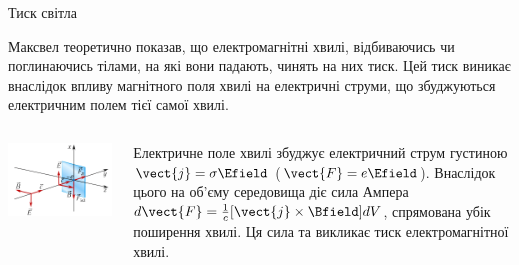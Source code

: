 \documentclass[onlytextwidth]{beamer}
\begin{document}
\begin{frame}{Тиск світла}{}
	\begin{block}{}\justifying\small
		Максвел теоретично показав, що електромагнітні хвилі, відбиваючись чи поглинаючись тілами, на які  вони падають, чинять на них тиск. Цей тиск виникає внаслідок впливу магнітного поля хвилі на електричні струми, що збуджуються електричним полем тієї самої хвилі.
	\end{block}
	\vspace*{-1.25em}
	\begin{columns}
		\begin{column}{0.4\linewidth}
			\begin{center}
				\includegraphics[width=1\linewidth]{pictures/elmagpresure}
			\end{center}
		\end{column}
		\begin{column}{0.6\linewidth}
			\begin{block}{}\justifying\small
				Електричне поле хвилі збуджує електричний струм густиною $ \vect{j} = \sigma\Efield $ ($ \vect{F} = e\Efield $). Внаслідок цього на об'єму середовища діє сила Ампера $ d\vect{F} = \frac1c[\vect{j}\times\Bfield] dV$, спрямована убік поширення хвилі. Ця сила та викликає тиск електромагнітної хвилі.

				\medskip


\end{block}
\end{column}
\end{columns}
\end{frame}
\end{document}
